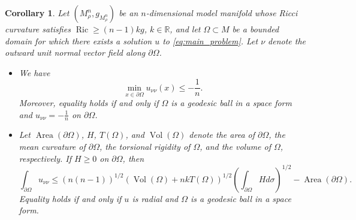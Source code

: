 \documentclass[reqno,11pt]{amsart}
\numberwithin{equation}{section}  %
\newtheorem{corollary}[theorem]{Corollary}
\begin{document}

\begin{corollary}\label{cor:model}
Let $(M_{\rho}^{n},g_{M_{\rho}^{n}})$ be an $n$-dimensional model manifold whose Ricci curvature satisfies $\operatorname{Ric}\geq (n-1)kg$, $k\in\mathbb{R}$, and let $\Omega\subset M$ be a bounded domain for which there exists a solution $u$ to \eqref{eq:main_problem}. Let $\nu$ denote the outward unit normal vector field along $\partial\Omega$.

\begin{itemize}
\item[(a)] We have
\[\min_{x\in\partial\Omega}u_{\nu\nu}(x)\leq -\frac{1}{n}.\]
Moreover, equality holds if and only if $\Omega$ is a geodesic ball in a space form and $u_{\nu\nu}=-\frac{1}{n}$ on $\partial\Omega$.

\item[(b)] Let $\operatorname{Area}(\partial\Omega)$, $H$, $T(\Omega)$, and $\operatorname{Vol}(\Omega)$ denote the area of $\partial\Omega$, the mean curvature of $\partial\Omega$, the torsional rigidity of $\Omega$, and the volume of $\Omega$, respectively. If $H\geq 0$ on $\partial\Omega$, then
\[\int_{\partial\Omega}u_{\nu\nu}\leq (n(n-1))^{1/2}\left(\operatorname{Vol}(\Omega) + nkT(\Omega)\right)^{1/2}\left(\int_{\partial\Omega}Hd\sigma\right)^{1/2} - \operatorname{Area}(\partial\Omega).\]
Equality holds if and only if $u$ is radial and $\Omega$ is a geodesic ball in a space form.
\end{itemize}
\end{corollary}
\end{document}
